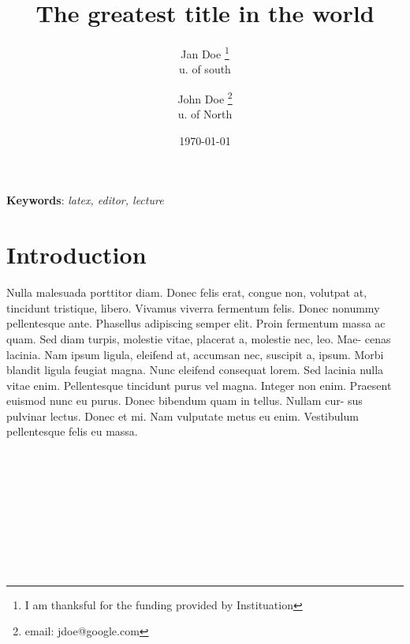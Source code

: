 \documentclass{article}
\title{The greatest title in the world}
\author{Jan Doe \thanks{I am thanksful for the funding provided by Instituation}\\u. of south \and John Doe \thanks{email: jdoe@google.com}\\u. of North}
\date{\today}
\begin{document}
\maketitle
\begin{abstract}
    \lipsum[1]
\end{abstract}

\textbf{Keywords}: \emph{latex, editor, lecture}

\section{Introduction}
Nulla malesuada porttitor diam. Donec felis erat, congue non, volutpat at,
tincidunt tristique, libero. Vivamus viverra fermentum felis. Donec nonummy
pellentesque ante. Phasellus adipiscing semper elit. Proin fermentum massa
ac quam. Sed diam turpis, molestie vitae, placerat a, molestie nec, leo. Mae-
cenas lacinia. Nam ipsum ligula, eleifend at, accumsan nec, suscipit a, ipsum.
Morbi blandit ligula feugiat magna. Nunc eleifend consequat lorem. Sed lacinia
nulla vitae enim. Pellentesque tincidunt purus vel magna. Integer non enim.
Praesent euismod nunc eu purus. Donec bibendum quam in tellus. Nullam cur-
sus pulvinar lectus\cite{doe2010}. Donec et mi. Nam vulputate metus eu enim. Vestibulum
pellentesque felis eu massa\cite{doe2012}.

\clearpage
\noindent\cite{gomez2017musculoskeletal}\\
\cite[p.12]{gomez2017musculoskeletal}\\
\cite[e.g.][p.12]{gomez2017musculoskeletal}\\
\cite[e.g.][]{gomez2017musculoskeletal}\\
\cite[][]{gomez2017musculoskeletal}\\
\citep{gomez2017musculoskeletal}\\
\cite*{gomez2017musculoskeletal}\\
\citep*{gomez2017musculoskeletal}\\








    
\end{document}
